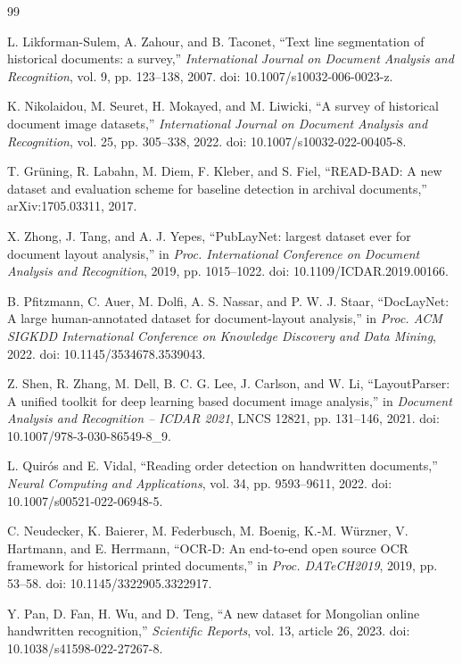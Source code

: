 \documentclass[pdflatex,sn-mathphys-num]{sn-jnl}
\begin{document}
\begin{thebibliography}{99}

L. Likforman-Sulem, A. Zahour, and B. Taconet, ``Text line segmentation of historical documents: a survey,'' \emph{International Journal on Document Analysis and Recognition}, vol. 9, pp. 123--138, 2007. doi: 10.1007/s10032-006-0023-z.

K. Nikolaidou, M. Seuret, H. Mokayed, and M. Liwicki, ``A survey of historical document image datasets,'' \emph{International Journal on Document Analysis and Recognition}, vol. 25, pp. 305--338, 2022. doi: 10.1007/s10032-022-00405-8.

T. Gr\"uning, R. Labahn, M. Diem, F. Kleber, and S. Fiel, ``READ-BAD: A new dataset and evaluation scheme for baseline detection in archival documents,'' arXiv:1705.03311, 2017.

X. Zhong, J. Tang, and A. J. Yepes, ``PubLayNet: largest dataset ever for document layout analysis,'' in \emph{Proc. International Conference on Document Analysis and Recognition}, 2019, pp. 1015--1022. doi: 10.1109/ICDAR.2019.00166.

B. Pfitzmann, C. Auer, M. Dolfi, A. S. Nassar, and P. W. J. Staar, ``DocLayNet: A large human-annotated dataset for document-layout analysis,'' in \emph{Proc. ACM SIGKDD International Conference on Knowledge Discovery and Data Mining}, 2022. doi: 10.1145/3534678.3539043.

Z. Shen, R. Zhang, M. Dell, B. C. G. Lee, J. Carlson, and W. Li, ``LayoutParser: A unified toolkit for deep learning based document image analysis,'' in \emph{Document Analysis and Recognition -- ICDAR 2021}, LNCS 12821, pp. 131--146, 2021. doi: 10.1007/978-3-030-86549-8\_9.

L. Quir\'os and E. Vidal, ``Reading order detection on handwritten documents,'' \emph{Neural Computing and Applications}, vol. 34, pp. 9593--9611, 2022. doi: 10.1007/s00521-022-06948-5.

C. Neudecker, K. Baierer, M. Federbusch, M. Boenig, K.-M. W\"urzner, V. Hartmann, and E. Herrmann, ``OCR-D: An end-to-end open source OCR framework for historical printed documents,'' in \emph{Proc. DATeCH2019}, 2019, pp. 53--58. doi: 10.1145/3322905.3322917.


Y. Pan, D. Fan, H. Wu, and D. Teng, ``A new dataset for Mongolian online handwritten recognition,'' \emph{Scientific Reports}, vol. 13, article 26, 2023. doi: 10.1038/s41598-022-27267-8.


\end{thebibliography}
\end{document}
